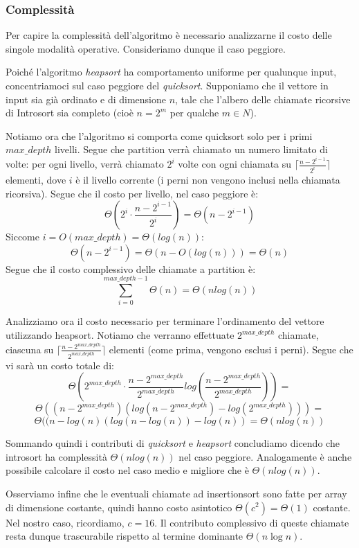 \documentclass{article}
\begin{document}
        \subsubsection{Complessità}
            Per capire la complessità dell'algoritmo è necessario analizzarne il costo delle singole modalità operative. Consideriamo dunque il caso peggiore.

            Poiché l’algoritmo \textit{heapsort} ha comportamento uniforme per qualunque input, concentriamoci sul caso peggiore del \textit{quicksort}. Supponiamo che il vettore in input sia già ordinato e di dimensione $n$, tale che l’albero delle chiamate ricorsive di Introsort sia completo (cioè $n = 2^m$ per qualche $m \in N$).
            
            Notiamo ora che l'algoritmo si comporta come quicksort solo per i primi $max\_depth$ livelli. Segue che partition verrà chiamato un numero limitato di volte: per ogni livello, verrà chiamato $2^i$ volte con ogni chiamata su $\lceil\frac{n - 2^{i - 1}}{2^i}\rceil$ elementi, dove $i$ è il livello corrente (i perni non vengono inclusi nella chiamata ricorsiva). Segue che il costo per livello, nel caso peggiore è:
                $$\Theta(2^i\cdot \frac{n - 2^{i - 1}}{2^i})=\Theta(n-2^{i-1})$$
            Siccome $i = O(max\_depth) = \Theta(log(n))$:
                $$\Theta(n-2^{i-1})=\Theta(n-O(log(n)))=\Theta(n)$$
            Segue che il costo complessivo delle chiamate a partition è:
                $$\sum_{i = 0}^{max\_depth - 1}{\Theta(n)}=\Theta(nlog(n))$$

            Analizziamo ora il costo necessario per terminare l'ordinamento del vettore utilizzando heapsort. Notiamo che verranno effettuate $2^{max\_depth}$ chiamate, ciascuna su $\lceil\frac{n-2^{max\_depth}}{2^{max\_depth}}\rceil$ elementi (come prima, vengono esclusi i perni). Segue che vi sarà un costo totale di:
                $$\Theta(2^{max\_depth}\cdot \frac{n-2^{max\_depth}}{2^{max\_depth}}log(\frac{n-2^{max\_depth}}{2^{max\_depth}}))=$$
                $$\Theta((n-2^{max\_depth})(log(n-2^{max\_depth})-log(2^{max\_depth})))=$$
                $$\Theta((n-log(n)(log(n-log(n))-log(n))=\Theta(nlog(n))$$

            Sommando quindi i contributi di \textit{quicksort} e \textit{heapsort} concludiamo dicendo che introsort ha complessità $\Theta(nlog(n))$ nel caso peggiore. Analogamente è anche possibile calcolare il costo nel caso medio e migliore che è $\Theta(nlog(n))$.

            Osserviamo infine che le eventuali chiamate ad insertionsort sono fatte per array di dimensione costante, quindi hanno costo asintotico $\Theta(c^2)=\Theta(1)$ costante. Nel nostro caso, ricordiamo, $c=16$. Il contributo complessivo di queste chiamate resta dunque trascurabile rispetto al termine dominante $\Theta(n \log n)$.
\end{document}
